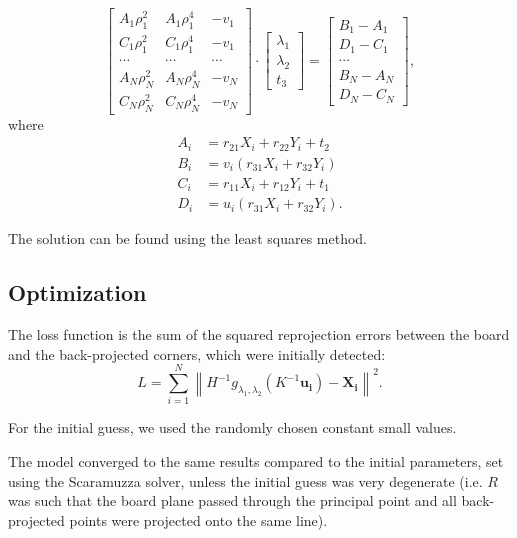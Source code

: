 \begin{equation}
	\begin{bmatrix}
		A_1 \rho_1^{2} & A_1 \rho_1^{4} & -v_1   \\
		C_1 \rho_1^{2} & C_1 \rho_1^{4} & -v_1   \\
		\cdots         & \cdots         & \cdots \\
		A_N \rho_N^{2} & A_N \rho_N^{4} & -v_N   \\
		C_N \rho_N^{2} & C_N \rho_N^{4} & -v_N
	\end{bmatrix} \cdot \begin{bmatrix}
		\lambda_1 \\
		\lambda_2 \\
		t_3
	\end{bmatrix} = \begin{bmatrix}
		B_1 - A_1 \\
		D_1 - C_1 \\
		\cdots    \\
		B_N - A_N \\
		D_N - C_N
	\end{bmatrix},
\end{equation}
where
\begin{align}
	A_i & = r_{21} X_i + r_{22} Y_i + t_2  \\
	B_i & = v_i (r_{31} X_i + r_{32} Y_i)  \\
	C_i & = r_{11} X_i + r_{12} Y_i + t_1  \\
	D_i & = u_i (r_{31} X_i + r_{32} Y_i).
\end{align}

The solution can be found using the least squares method.

\subsection{Optimization}\label{sub:optimization}

The loss function is the sum of the squared reprojection errors between the board and
the back-projected corners, which were initially detected:
\begin{equation}
	L = \sum_{i=1}^{N} \left\lVert
	H^{-1} g_{\lambda_1, \lambda_2}(K^{-1} \mathbf{u_i}) -
	\mathbf{X_i} \right\rVert^2.
\end{equation}

For the initial guess, we used the randomly chosen constant small values.

The model converged to the same results compared to the initial parameters, set
using the Scaramuzza solver, unless the initial guess was very degenerate (i.e.
\(R\) was such that the board plane passed through the principal point and all
back-projected points were projected onto the same line).

